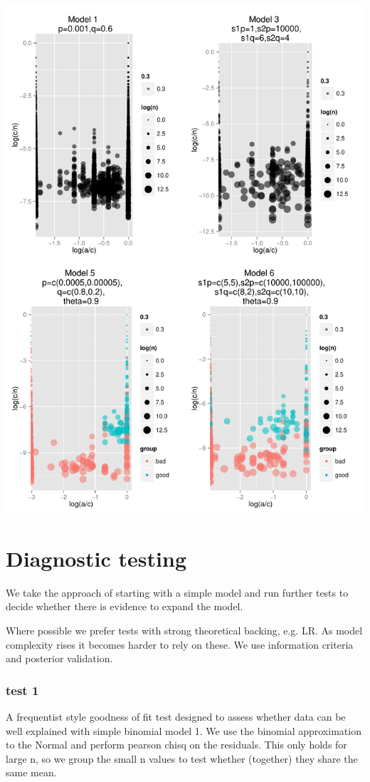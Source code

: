 \documentclass[11pt,a4,singlespacing,titlepagenumber=on]{scrreprt}
\numberwithin{equation}{chapter} %
\theoremstyle{remark}
\begin{document}
\includegraphics[scale=0.7]{SynthData}

\chapter{Diagnostic testing}

We take the approach of starting with a simple model and run further tests to decide whether there is evidence to expand the model. 

Where possible we prefer tests with strong theoretical backing, e.g. LR. As model complexity rises it becomes harder to rely on these. We use information criteria and posterior validation.

\subsection{test 1} A frequentist style goodness of fit test designed to assess whether data can be well explained with simple binomial model 1. We use the binomial approximation to the Normal and perform pearson chisq on the residuals. This only holds for large n, so we group the small n values to test whether (together) they share the same mean.
\end{document}
